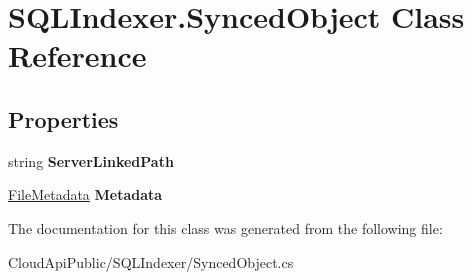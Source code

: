 \hypertarget{class_s_q_l_indexer_1_1_synced_object}{\section{S\-Q\-L\-Indexer.\-Synced\-Object Class Reference}
\label{class_s_q_l_indexer_1_1_synced_object}
}
\subsection*{Properties}
\begin{DoxyCompactItemize}
\item 
\hypertarget{class_s_q_l_indexer_1_1_synced_object_ac4ef1ab4bf1228469b1c3c54dd805057}{string {\bfseries Server\-Linked\-Path}}\label{class_s_q_l_indexer_1_1_synced_object_ac4ef1ab4bf1228469b1c3c54dd805057}

\item 
\hypertarget{class_s_q_l_indexer_1_1_synced_object_af6eea8f1abaf953cba17f81385285438}{\hyperlink{class_cloud_api_public_1_1_model_1_1_file_metadata}{File\-Metadata} {\bfseries Metadata}}\label{class_s_q_l_indexer_1_1_synced_object_af6eea8f1abaf953cba17f81385285438}

\end{DoxyCompactItemize}


The documentation for this class was generated from the following file\-:\begin{DoxyCompactItemize}
\item 
Cloud\-Api\-Public/\-S\-Q\-L\-Indexer/Synced\-Object.\-cs\end{DoxyCompactItemize}
